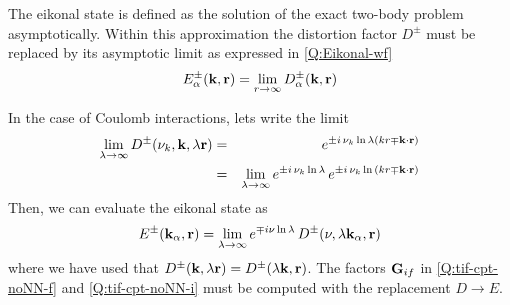 The eikonal state is defined as the solution of the exact two-body
problem asymptotically. Within this approximation the distortion factor
$D^{\pm}$ must be replaced by its asymptotic limit as expressed in
\ref{Q:Eikonal-wf}
\[
E^{\pm}_{\alpha}(\mathbf{k},\mathbf{r}) = \lim_{r \to \infty}
D^{\pm}_{\alpha}(\mathbf{k},\mathbf{r})
\]

In the case of Coulomb interactions, lets write the limit
\begin{eqnarray*}
\lim_{\lambda \to \infty} D^{\pm}(\nu_{k}, \mathbf{k},\lambda \mathbf{r}) &=&
e^{{\pm} i \, \nu_{k} \ln{\lambda \left( k r \mp \mathbf{k}\cdot \mathbf{r}
\right)}}
\\
&=& \lim_{\lambda \to \infty} e^{\pm i \, \nu_{k} \ln{\lambda}}
\, e^{ \pm i \, \nu_{k} \ln{\left( k r \mp \mathbf{k} \cdot \mathbf{r}
\right)}}
\end{eqnarray*}
%
Then, we can evaluate the eikonal state as
%
\begin{equation}\label{Q:Eikonal-wf-Coul}
E^{\pm} (\mathbf{k}_{\alpha}, \mathbf{r}) = \lim_{\lambda \to \infty} e^{\mp
i \nu \ln{ \lambda}} \, D^{\pm}(\nu , \lambda \mathbf{k}_{\alpha}, \mathbf{r})
\end{equation}
where we have used that $D^{\pm} (\mathbf{k},\lambda \mathbf{r})= D^{\pm} (\lambda
\mathbf{k}, \mathbf{r})$.
%
The factors $\mathbf{G}_{if}$ in \ref{Q:tif-cpt-noNN-f} and
\ref{Q:tif-cpt-noNN-i} must be computed with the replacement $D \to E$.


